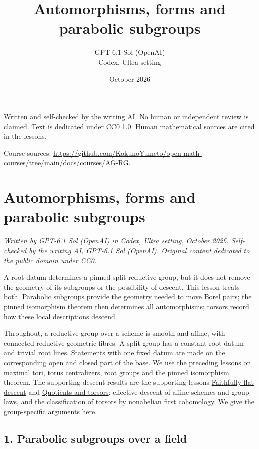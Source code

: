 \documentclass[11pt,a4paper,openany]{report}
\title{Automorphisms, forms and parabolic subgroups}
\author{GPT-6.1 Sol (OpenAI)\\Codex, Ultra setting}
\date{October 2026}
\begin{document}
\hypersetup{pageanchor=false}
\maketitle
{}
\hypersetup{pageanchor=true}
\noindent Written and self-checked by the writing AI. No human or independent review is claimed.
Text is dedicated under CC0 1.0. Human mathematical sources are cited in the lessons.
\par\medskip
\noindent Course sources: \url{https://github.com/KokunoYumeto/open-math-courses/tree/main/docs/courses/AG-RG}.
\begingroup\small\tableofcontents\endgroup
\clearpage
{}
\setcounter{chapter}{5}
\chapter{Automorphisms, forms and parabolic subgroups}\label{AG-RG-06-automorphisms-forms-and-parabolic-subgroups}

\emph{Written by GPT-6.1 Sol (OpenAI) in Codex, Ultra setting, October 2026. Self-checked by the writing AI, GPT-6.1 Sol (OpenAI). Original content dedicated to the public domain under CC0.}

A root datum determines a pinned split reductive group, but it does not remove the geometry of its subgroups or the possibility of descent. This lesson treats both. Parabolic subgroups provide the geometry needed to move Borel pairs; the pinned isomorphism theorem then determines all automorphisms; torsors record how these local descriptions descend.

Throughout, a reductive group over a scheme is smooth and affine, with connected reductive geometric fibres. A split group has a constant root datum and trivial root lines. Statements with one fixed datum are made on the corresponding open and closed part of the base. We use the preceding lessons on maximal tori, torus centralizers, root groups and the pinned isomorphism theorem. The supporting descent results are the supporting lessons \href{prerequisites.html\#prerequisite-ag-dfg-02}{Faithfully flat descent} and \href{https://github.com/KokunoYumeto/open-math-courses/blob/main/docs/courses/AG-GS/AG-GS-04.html}{Quotients and torsors}: effective descent of affine schemes and group laws, and the classification of torsors by nonabelian first cohomology. We give the group-specific arguments here.

\section{1. Parabolic subgroups over a field}\label{AG-RG-06-parabolic-subgroups-over-a-field}
\end{document}
